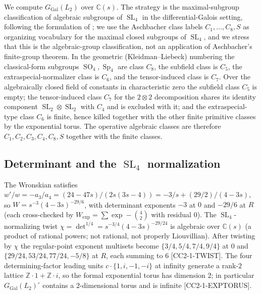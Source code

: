 \documentclass[11pt,reqno]{amsart}
\theoremstyle{plain}
\theoremstyle{definition}
\theoremstyle{remark}
\newcommand{\C}{\mathbb{C}}
\newcommand{\Z}{\mathbb{Z}}
\newcommand{\GGal}{G_{\mathrm{Gal}}}
\newcommand{\SL}{\operatorname{SL}}
\newcommand{\Sp}{\operatorname{Sp}}
\newcommand{\SO}{\operatorname{SO}}
\DeclareMathOperator{\Det}{det}
\newcommand{\Ltwo}{L_{2}}
\newcommand{\claim}[1]{\textsf{\small[#1]}}
\begin{document}
We compute $\GGal(\Ltwo)$ over $\C(s)$. The strategy is the
maximal-subgroup classification of algebraic subgroups of $\SL_{4}$ in the
differential-Galois setting, following the formulation of
\cite[Ch.~4]{vdPutSinger}; we use the Aschbacher class labels
$C_{1},\dots,C_{8},S$ as organizing vocabulary for the maximal closed subgroups
of $\SL_{4}$, and we stress that this is the algebraic-group classification,
not an application of Aschbacher's finite-group theorem. In the geometric
(Kleidman--Liebeck) numbering the classical-form subgroups $\SO_{4},\Sp_{4}$
are class $C_{8}$, the subfield class is $C_{5}$, the extraspecial-normalizer
class is $C_{6}$, and the tensor-induced class is $C_{7}$. Over the
algebraically closed field of constants in characteristic zero the subfield
class $C_{5}$ is empty; the tensor-induced class $C_{7}$ for the $2\otimes2$
decomposition shares its identity component $\SL_{2}\otimes\SL_{2}$ with $C_{4}$
and is excluded with it; and the extraspecial-type class $C_{6}$ is finite,
hence killed together with the other finite primitive classes by the
exponential torus. The operative algebraic classes are therefore
$C_{1},C_{2},C_{3},C_{4},C_{8},S$ together with the finite classes.

\subsection{Determinant and the $\SL_{4}$ normalization}
The Wronskian satisfies $w'/w=-a_{3}/a_{4}=(24-47s)/(2s(3s-4))
=-3/s+(29/2)/(4-3s)$, so $W=s^{-3}(4-3s)^{-29/6}$, with determinant exponents
$-3$ at $0$ and $-29/6$ at $R$ (each cross-checked by
$W_{\exp}=\sum\exp-\binom{4}{2}$ with residual $0$). The $\SL_{4}$-normalizing
twist $\chi=\Det^{1/4}=s^{-3/4}(4-3s)^{-29/24}$ is algebraic over $\C(s)$ (a
product of rational powers; not rational, not properly Liouvillian). After
twisting by $\chi$ the regular-point exponent multisets become
$\{3/4,5/4,7/4,9/4\}$ at $0$ and $\{29/24,53/24,77/24,-5/8\}$ at $R$, each
summing to $6$ \claim{CC2-1-TWIST}. The four determining-factor leading units
$c\cdot\{1,i,-1,-i\}$ at infinity generate a rank-$2$ lattice
$\Z\cdot1+\Z\cdot i$, so the formal exponential torus has dimension $2$; in
particular $\GGal(\Ltwo)^{\circ}$ contains a $2$-dimensional torus and is
infinite \claim{CC2-1-EXPTORUS}.
\end{document}
